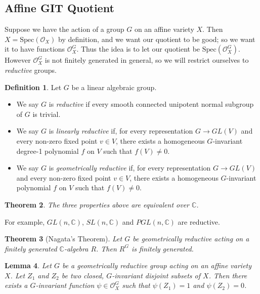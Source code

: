 \documentclass{article}
\newtheorem{theorem}{Theorem}
\newtheorem{lemma}[theorem]{Lemma}
\theoremstyle{definition}
\newtheorem{definition}[theorem]{Definition}
\theoremstyle{remark}
\numberwithin{theorem}{section}
\newcommand{\C}{\mathbb{C}}
\newcommand{\OO}{\mathcal{O}}
\newcommand{\Spec}{\text{Spec}}
\newenvironment{thm}{
\begin{mdframed}
	\vspace{-0.5em}
	\begin{theorem}
}{
	\end{theorem}
\end{mdframed}
}
\newenvironment{defn}{
	\begin{mdframed}
		\vspace{-0.5em}
		\begin{definition}
		}{
		\end{definition}
	\end{mdframed}
}
\begin{document}
\subsection{Affine GIT Quotient}
Suppose we have the action of a group $G$ on an affine variety $X$. Then $X=\Spec(\OO_X)$ by definition, and we want our quotient to be good; so we want it to have functions $\OO_X^G$. Thus the idea is to let our quotient be $\Spec(\OO_X^G)$. However $\OO_X^G$ is not finitely generated in general, so we will restrict ourselves to \emph{reductive} groups.
\begin{defn}
	Let $G$ be a linear algebraic group.
	\begin{itemize}
		\item We say $G$ is \emph{reductive} if every smooth connected unipotent normal subgroup of $G$ is trivial.
		\item We say $G$ is \emph{linearly reductive} if, for every representation $G\to GL(V)$ and every non-zero fixed point $v\in V$, there exists a homogeneous $G$-invariant degree-1 polynomial $f$ on $V$ such that $f(V)\neq 0$.
		\item We say $G$ is \emph{geometrically reductive} if, for every representation $G\to GL(V)$ and every non-zero fixed point $v\in V$, there exists a homogeneous $G$-invariant polynomial $f$ on $V$ such that $f(V) \neq 0$.
	\end{itemize}
\end{defn}
\begin{thm}
	The three properties above are equivalent over $\C$. 
\end{thm}
For example, $GL(n,\C)$, $SL(n,\C)$ and $PGL(n,\C)$ are reductive.
\begin{thm}[Nagata's Theorem]
	Let $G$ be geometrically reductive acting on a finitely generated $\C$-algebra $R$. Then $R^G$ is finitely generated. 
\end{thm}
\begin{lemma}
	Let $G$ be a geometrically reductive group acting on an affine variety $X$. Let $Z_1$ and $Z_2$ be two closed, $G$-invariant disjoint subsets of $X$. Then there exists a $G$-invariant function $\psi\in\OO_X^G$ such that $\psi(Z_1)=1$ and $\psi(Z_2)=0$.
\end{lemma}
\end{document}

